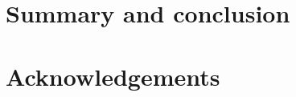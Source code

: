 \documentclass[UKenglish]{latex/atlasdoc}
\newcommand{\Macro}[1]{\texttt{\textbackslash #1}\xspace}
\begin{document}





\section{Summary and conclusion}
\label{sec:summary}






\section*{Acknowledgements}
\label{sec:acknowldge}
\end{document}
